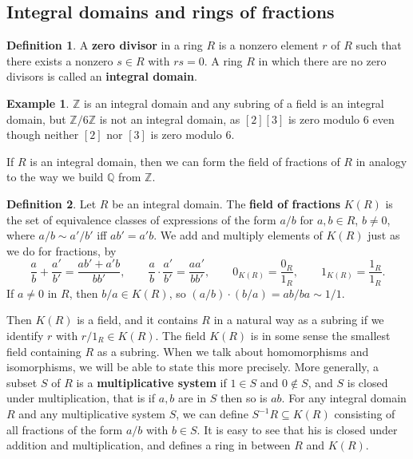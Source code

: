 \documentclass{article}
\newcommand{\Z}{\mathbb{Z}}
\newcommand{\Q}{\mathbb{Q}}
\newcommand{\rb}[1]{\left( #1 \right)}
\renewcommand{\sb}[1]{\left[ #1 \right]}
\theoremstyle{definition}\newtheorem{definition}{Definition}[subsection]
\theoremstyle{definition}\newtheorem{remark}[definition]{Remark}
\theoremstyle{definition}\newtheorem*{example}{Example}
\theoremstyle{definition}\newtheorem*{note}{Note}
\begin{document}

\subsection{Integral domains and rings of fractions}

\begin{definition}
A \textbf{zero divisor} in a ring $ R $ is a nonzero element $ r $ of $ R $ such that there exists a nonzero $ s \in R $ with $ rs = 0 $. A ring $ R $ in which there are no zero divisors is called an \textbf{integral domain}.
\end{definition}

\begin{example}
$ \Z $ is an integral domain and any subring of a field is an integral domain, but $ \Z / 6\Z $ is not an integral domain, as $ \sb{2}\sb{3} $ is zero modulo $ 6 $ even though neither $ \sb{2} $ nor $ \sb{3} $ is zero modulo $ 6 $.
\end{example}

If $ R $ is an integral domain, then we can form the field of fractions of $ R $ in analogy to the way we build $ \Q $ from $ \Z $.

\begin{definition}
Let $ R $ be an integral domain. The \textbf{field of fractions} $ K\rb{R} $ is the set of equivalence classes of expressions of the form $ a / b $ for $ a, b \in R $, $ b \ne 0 $, where $ a / b \sim a' / b' $ iff $ ab' = a'b $. We add and multiply elements of $ K\rb{R} $ just as we do for fractions, by
$$ \dfrac{a}{b} + \dfrac{a'}{b'} = \dfrac{ab' + a'b}{bb'}, \qquad \dfrac{a}{b} \cdot \dfrac{a'}{b'} = \dfrac{aa'}{bb'}, \qquad 0_{K\rb{R}} = \dfrac{0_R}{1_R}, \qquad 1_{K\rb{R}} = \dfrac{1_R}{1_R}. $$
If $ a \ne 0 $ in $ R $, then $ b / a \in K\rb{R} $, so $ \rb{a / b} \cdot \rb{b / a} = ab / ba \sim 1 / 1 $.
\end{definition}

Then $ K\rb{R} $ is a field, and it contains $ R $ in a natural way as a subring if we identify $ r $ with $ r / 1_R \in K\rb{R} $. The field $ K\rb{R} $ is in some sense the smallest field containing $ R $ as a subring. When we talk about homomorphisms and isomorphisms, we will be able to state this more precisely. More generally, a subset $ S $ of $ R $ is a \textbf{multiplicative system} if $ 1 \in S $ and $ 0 \notin S $, and $ S $ is closed under multiplication, that is if $ a, b $ are in $ S $ then so is $ ab $. For any integral domain $ R $ and any multiplicative system $ S $, we can define $ S^{-1}R \subseteq K\rb{R} $ consisting of all fractions of the form $ a / b $ with $ b \in S $. It is easy to see that his is closed under addition and multiplication, and defines a ring in between $ R $ and $ K\rb{R} $.
\end{document}

